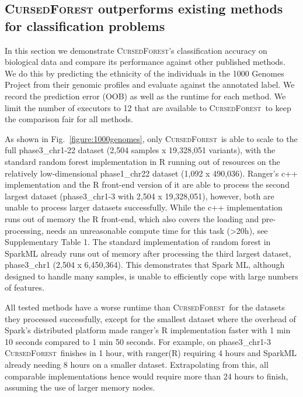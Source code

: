 \documentclass[10pt,letterpaper]{article}
\newcommand{\cursedforest}{\textsc{CursedForest}\xspace}
\begin{document}
\subsection{\cursedforest outperforms existing methods for classification problems}
In this section we demonstrate \cursedforest's classification accuracy on biological data and compare its performance against other published methods. 
We do this by predicting the ethnicity of the individuals in the 1000 Genomes Project from their genomic profiles and evaluate against the annotated label. 
We record the prediction error (OOB) as well as the runtime for each method. 
We limit the number of executors to 12 that are available to \cursedforest\ to keep the comparison fair for all methods.  

As shown in Fig.~\ref{figure:1000genomes}, only \cursedforest\ is able to scale to the full phase3\_chr1-22 dataset (2,504 samples x 19,328,051 variants), with
the standard random forest implementation in R running out of resources on the relatively low-dimensional
phase1\_chr22 dataset (1,092 x 490,036). 
Ranger's c++ implementation and the R front-end version of it are able to process the second largest dataset (phase3\_chr1-3 with 2,504 x 19,328,051), however, both are unable to process larger datasets successfully. 
While the c++ implementation runs out of memory the R front-end, which also covers the loading and pre-processing, needs an unreasonable compute time for this task (>20h), see Supplementary Table 1.
The standard implementation of random forest in SparkML already runs out of memory after processing the third largest dataset, phase3\_chr1 (2,504 x 6,450,364). 
This demonstrates that Spark ML, although designed to handle many samples, is unable to efficiently cope with large numbers of features. 

All tested methods have a worse runtime than \cursedforest\ for the datasets they processed successfully, except for the smallest dataset where the overhead of Spark's distributed platform made ranger's R implementation faster with 1 min 10 seconds compared to 1 min 50 seconds. For example, on phase3\_chr1-3 \cursedforest\ finishes in 1 hour, with ranger(R) requiring 4 hours and SparkML already needing 8 hours on a smaller dataset. 
Extrapolating from this, all comparable implementations hence would require more than 24 hours to finish, assuming the use of larger memory nodes.  
\end{document}
